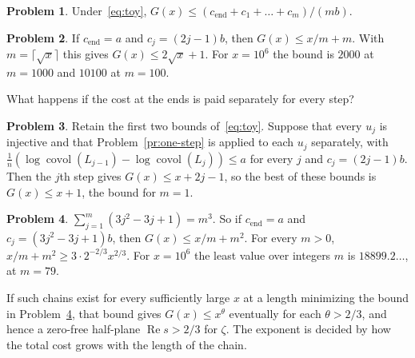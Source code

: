 \documentclass[reqno]{amsart}
\theoremstyle{definition}
\newtheorem{problem}{Problem}[section]
\theoremstyle{plain}
\newcommand{\covol}{\operatorname{covol}}
\begin{document}
\begin{problem}\label{pr:toy}
Under~\eqref{eq:toy}, \(G(x) \le (c_{\mathrm{end}} + c_1 + \dots + c_m)/(mb)\).
\end{problem}

\begin{problem}\label{pr:half}
If \(c_{\mathrm{end}} = a\) and \(c_j = (2j - 1)b\), then \(G(x) \le x/m + m\).  With \(m = \lceil \sqrt x \rceil\) this gives \(G(x) \le 2\sqrt x + 1\).  For \(x = 10^6\) the bound is \(2000\) at \(m = 1000\) and \(10100\) at \(m = 100\).
\end{problem}

What happens if the cost at the ends is paid separately for every step?

\begin{problem}\label{pr:every-step}
Retain the first two bounds of~\eqref{eq:toy}.  Suppose that every \(u_j\) is injective and that Problem~\ref{pr:one-step} is applied to each \(u_j\) separately, with \(\frac1n (\log \covol(L_{j-1}) - \log \covol(L_j)) \le a\) for every \(j\) and \(c_j = (2j-1)b\).  Then the \(j\)th step gives \(G(x) \le x + 2j - 1\), so the best of these bounds is \(G(x) \le x + 1\), the bound for \(m = 1\).
\end{problem}

\begin{problem}\label{pr:two-thirds}
\(\sum_{j=1}^m (3j^2 - 3j + 1) = m^3\).  So if \(c_{\mathrm{end}} = a\) and \(c_j = (3j^2 - 3j + 1)b\), then \(G(x) \le x/m + m^2\).  For every \(m > 0\), \(x/m + m^2 \ge 3 \cdot 2^{-2/3} x^{2/3}\).  For \(x = 10^6\) the least value over integers \(m\) is \(18899.2\ldots\), at \(m = 79\).
\end{problem}

If such chains exist for every sufficiently large \(x\) at a length minimizing the bound in Problem~\ref{pr:two-thirds}, that bound gives \(G(x) \le x^\theta\) eventually for each \(\theta > 2/3\), and hence a zero-free half-plane \(\operatorname{Re} s > 2/3\) for \(\zeta\).  The exponent is decided by how the total cost grows with the length of the chain.
\end{document}
